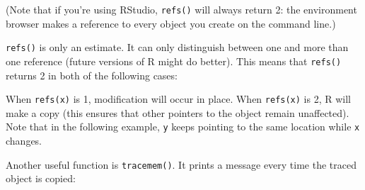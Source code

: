 (Note that if you're using RStudio, \texttt{refs()} will always return
2: the environment browser makes a reference to every object you create
on the command line.)

\texttt{refs()} is only an estimate. It can only distinguish between one
and more than one reference (future versions of R might do better). This
means that \texttt{refs()} returns 2 in both of the following cases:

\begin{Shaded}
\begin{Highlighting}[]
\StringTok{ }\NormalTok{:}
\StringTok{ }

\StringTok{ }\NormalTok{:}
\StringTok{ }
\StringTok{ }
\end{Highlighting}
\end{Shaded}

When \texttt{refs(x)} is 1, modification will occur in place. When
\texttt{refs(x)} is 2, R will make a copy (this ensures that other
pointers to the object remain unaffected). Note that in the following
example, \texttt{y} keeps pointing to the same location while \texttt{x}
changes.

\begin{Shaded}
\begin{Highlighting}[]
\StringTok{ }\NormalTok{:}
\StringTok{ }
\NormalTok{(}

\NormalTok{x[}\NormalTok{] <-}\StringTok{ }
\NormalTok{(}
\end{Highlighting}
\end{Shaded}

Another useful function is \texttt{tracemem()}. It prints a message
every time the traced object is copied: 

